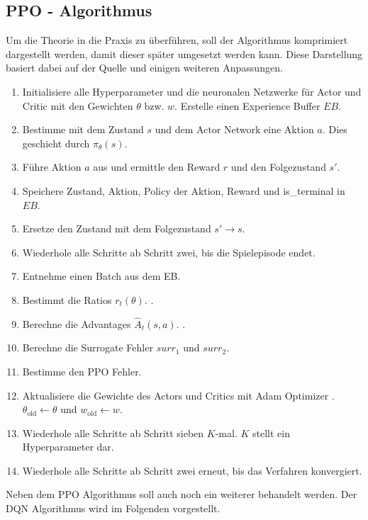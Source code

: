 \subsection{PPO - Algorithmus} \label{subsec:Grundlagen_PPO_Algorithmus}
Um die Theorie in die Praxis zu überführen, soll der Algorithmus komprimiert dargestellt werden, damit dieser später umgesetzt werden kann. 
Diese Darstellung basiert dabei auf der Quelle \citep{PPO} und einigen weiteren Anpassungen.
\begin{enumerate}
	\item Initialisiere alle Hyperparameter und die neuronalen Netzwerke für Actor und Critic mit den Gewichten $\theta$ bzw. $w$. Erstelle einen Experience Buffer $EB$.
	\item Bestimme mit dem Zustand $s$ und dem Actor Network eine Aktion $a$. Dies geschieht durch $\pi_{\theta}(s)$.
	\item Führe Aktion $a$ aus und ermittle den Reward $r$ und den Folgezustand $s'$.
	\item Speichere Zustand, Aktion, Policy der Aktion, Reward und is\_terminal in $EB$.
	\item Ersetze den Zustand mit dem Folgezustand $s' \longrightarrow s$.
	\item Wiederhole alle Schritte ab Schritt zwei, bis die Spielepisode endet.
	\item Entnehme einen Batch aus dem EB.
	\item Bestimmt die Ratios $r_t(\theta)$. .
	\item Berechne die Advantages $\hat{A}_{t}(s, a)$. .
	\item Berechne die Surrogate Fehler  $surr_1$ und $surr_2$.
	\item Bestimme den PPO Fehler. 
	\item Aktualisiere die Gewichte des Actors und Critics mit Adam Optimizer \citep{PPO}. $\theta_{\text{old}} \longleftarrow \theta$ und $w_{\text{old}} \longleftarrow w$.
	\item Wiederhole alle Schritte ab Schritt sieben $K$-mal. $K$ stellt ein Hyperparameter dar.
	\item Wiederhole alle Schritte ab Schritt zwei erneut, bis das Verfahren konvergiert.
\end{enumerate}
Neben dem PPO Algorithmus soll auch noch ein weiterer behandelt werden. Der DQN Algorithmus wird im Folgenden vorgestellt.

